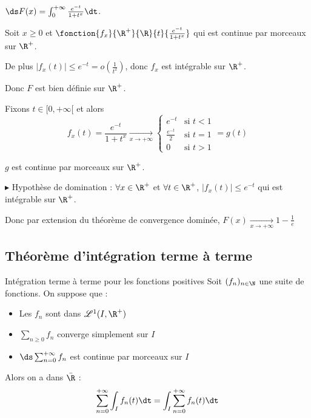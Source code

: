 \begin{exemple}
    $\ds F(x) = \int_0^{+ \infty} \frac{e^{-t}}{1 + t^x} \dt$.

    Soit $x \geqslant 0$ et $\fonction {f_x}{\R^+}{\R}{t}{\frac{e^{-t}}{1 + t^x}}$ qui est continue par morceaux sur $\R^+$.

    De plus $|f_x(t)| \leqslant e^{-t} = o\left( \frac 1 {t^2} \right)$, donc $f_x$ est intégrable sur $\R^+$.

    Donc $F$ est bien définie sur $\R^+$.

    Fixons $t \in [0, + \infty[ $ et alors 
    $$f_x(t) = \frac{e^{-t}}{1 + t^x} \xrightarrow[x \to + \infty]{} \begin{cases}
        e^{-t} & \text{si } t < 1 \\
        \frac{e^{-t}}{2} & \text{si } t = 1 \\
        0 & \text{si } t > 1
    \end{cases} = g(t)$$

    $g$ est continue par morceaux sur $\R^+$. 

    $\blacktriangleright$ Hypothèse de domination : $\forall x \in \R^+$ et $\forall t \in \R^+$, $|f_x(t)| \leqslant e^{-t}$ qui est intégrable sur $\R^+$.

    Donc par extension du théorème de convergence dominée, $F(x) \xrightarrow[x \to + \infty]{} 1 - \frac 1 e$
\end{exemple}

\subsection{Théorème d'intégration terme à terme}

\begin{theoreme}{Intégration terme à terme pour les fonctions positives}{}
    Soit $(f_n)_{n \in \N}$ une suite de fonctions. On suppose que : 
    \begin{itemize}
        \item Les $f_n$ sont dans $\mathscr L^1(I, \R^+)$
        \item $\sum_{n \geqslant 0} f_n$ converge simplement sur $I$
        \item $\ds \sum_{n = 0}^{+ \infty} f_n$ est continue par morceaux sur $I$
    \end{itemize}
    Alors on a dans $\bar \R$ : 
    $$\sum_{n = 0}^{+ \infty} \int_I f_n(t) \dt = \int_I \sum_{n = 0}^{+ \infty} f_n(t) \dt$$
\end{theoreme}

